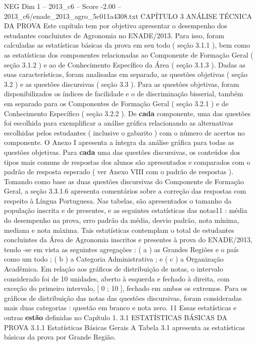 \begin{textsample}{NEG Dim 1 – 2013\_c6 – Score -2.00 – 2013\_c6/enade\_2013\_agro\_5c011a4308.txt}  \label{ex:f1_neg_269}
CAPÍTULO 3 ANÁLISE TÉCNICA DA PROVA Este capítulo tem por objetivo apresentar o desempenho dos estudantes concluintes de Agronomia no ENADE/2013.
Para isso, foram calculadas as estatísticas básicas da prova em seu todo ( seção 3.1.1 ), bem como as estatísticas dos componentes relacionadas ao Componente de Formação Geral ( seção 3.1.2 ) e ao de Conhecimento Específico da Área ( seção 3.1.3 ).
Dadas as suas características, foram analisadas em separado, as questões objetivas ( seção 3.2 ) e as questões discursivas ( seção 3.3 ).
Para as questões objetivas, foram disponibilizados os índices de facilidade e o de discriminação bisserial, também em separado para os Componentes de Formação Geral ( seção 3.2.1 ) e de Conhecimento Específico ( seção 3.2.2 ).
De \textbf{cada} componente, uma das questões foi escolhida para exemplificar a análise gráfica relacionando as alternativas escolhidas pelos estudantes ( inclusive o gabarito ) com o número de acertos no componente.
O Anexo I apresenta a íntegra da análise gráfica para todas as questões objetivas.
Para \textbf{cada} uma das questões discursivas, os conteúdos dos tipos mais comuns de respostas dos alunos são apresentados e comparados com o padrão de resposta esperado ( ver Anexo VIII com o padrão de respostas ).
Tomando como base as duas questões discursivas do Componente de Formação Geral, a seção 3.3.1.6 apresenta comentários sobre a correção das respostas com respeito à Língua Portuguesa.
Nas tabelas, são apresentados o tamanho da população inscrita e de presentes, e as seguintes estatísticas das notas11 : média do desempenho na prova, erro padrão da média, desvio padrão, nota mínima, mediana e nota máxima.
Tais estatísticas contemplam o total de estudantes concluintes da Área de Agronomia inscritos e presentes à prova do ENADE/2013, tendo -se em vista as seguintes agregações : ( a ) as Grandes Regiões e o país como um todo ; ( b ) a Categoria Administrativa ; e ( c ) a Organização Acadêmica.
Em relação aos gráficos de distribuição de notas, o intervalo considerado foi de 10 unidades, aberto à esquerda e fechado à direita, com exceção do primeiro intervalo, [ 0 ; 10 ], fechado em ambos os extremos.
Para os gráficos de distribuição das notas das questões discursivas, foram consideradas mais duas categorias : questão em branco e nota zero. 11 Essas estatísticas e outras \textbf{estão} definidas no Capítulo 1. 3.1 ESTATÍSTICAS BÁSICAS DA PROVA 3.1.1 Estatísticas Básicas Gerais A Tabela 3.1 apresenta as estatísticas básicas da prova por Grande Região.

\end{textsample}
